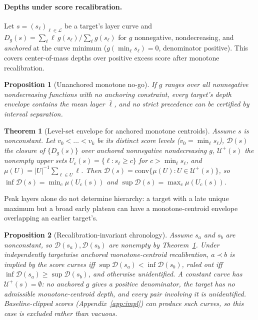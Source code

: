 \documentclass[11pt]{article}
\newtheorem{theorem}{Theorem}
\newtheorem{proposition}{Proposition}
\begin{document}
\paragraph{Depths under score recalibration.} Let $s=(s_\ell)_{\ell\in\mathcal{L}}$ be a target's layer curve and $D_g(s)=\sum_\ell \ell\, g(s_\ell)/\sum_\ell g(s_\ell)$ for $g$ nonnegative, nondecreasing, and \emph{anchored} at the curve minimum ($g(\min_\ell s_\ell)=0$, denominator positive). This covers center-of-mass depths over positive excess score after monotone recalibration.

\begin{proposition}[Unanchored monotone no-go]
\label{prop:nogo}
If $g$ ranges over all nonnegative nondecreasing functions with no anchoring constraint, every target's depth envelope contains the mean layer $\bar\ell$, and no strict precedence can be certified by interval separation.
\end{proposition}

\begin{theorem}[Level-set envelope for anchored monotone centroids]
\label{thm:levelset}
Assume $s$ is nonconstant. Let $v_0<\dots<v_k$ be its distinct score levels ($v_0=\min_\ell s_\ell$), $\mathcal{D}(s)$ the closure of $\{D_g(s)\}$ over anchored nonnegative nondecreasing $g$, $\mathcal{U}^+(s)$ the nonempty upper sets $U_c(s)=\{\ell:s_\ell\ge c\}$ for $c>\min_\ell s_\ell$, and $\mu(U)=|U|^{-1}\sum_{\ell\in U}\ell$. Then $\mathcal{D}(s)=\mathrm{conv}\{\mu(U):U\in\mathcal{U}^+(s)\}$, so $\inf\mathcal{D}(s)=\min_c\mu(U_c(s))$ and $\sup\mathcal{D}(s)=\max_c\mu(U_c(s))$.
\end{theorem}

Peak layers alone do not determine hierarchy: a target with a late unique maximum but a broad early plateau can have a monotone-centroid envelope overlapping an earlier target's.

\begin{proposition}[Recalibration-invariant chronology]
\label{prop:recal}
Assume $s_a$ and $s_b$ are nonconstant, so $\mathcal{D}(s_a),\mathcal{D}(s_b)$ are nonempty by Theorem~\ref{thm:levelset}. Under independently targetwise anchored monotone-centroid recalibration, $a\prec b$ is implied by the score curves iff $\sup\mathcal{D}(s_a)<\inf\mathcal{D}(s_b)$, ruled out iff $\inf\mathcal{D}(s_a)\ge\sup\mathcal{D}(s_b)$, and otherwise unidentified. A constant curve has $\mathcal{U}^+(s)=\emptyset$: no anchored $g$ gives a positive denominator, the target has no admissible monotone-centroid depth, and every pair involving it is unidentified. Baseline-clipped scores (Appendix~\ref{app:impl}) can produce such curves, so this case is excluded rather than vacuous.
\end{proposition}
\end{document}
